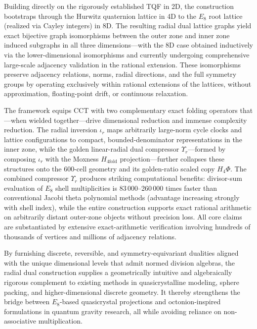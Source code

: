 \documentclass{article}
\begin{document}
Building directly on the rigorously established TQF in 2D, the construction bootstraps through the Hurwitz quaternion lattice in 4D to the $E_8$ root lattice (realized via Cayley integers) in 8D. The resulting radial dual lattice graphs yield exact bijective graph isomorphisms between the outer zone and inner zone induced subgraphs in all three dimensions---with the 8D case obtained inductively via the lower-dimensional isomorphisms and currently undergoing comprehensive large-scale adjacency validation in the rational extension. These isomorphisms preserve adjacency relations, norms, radial directions, and the full symmetry groups by operating exclusively within rational extensions of the lattices, without approximation, floating-point drift, or continuous relaxation.

The framework equips CCT with two complementary exact folding operators that---when wielded together---drive dimensional reduction and immense complexity reduction.
The radial inversion \(\iota_r\) maps arbitrarily large-norm cycle clocks and lattice configurations to compact, bounded-denominator representations in the inner zone,
while the golden linear-radial dual compressor \(\Upsilon_r\)---formed by composing \(\iota_r\) with the Moxness \(H_{4\mathrm{fold}}\) projection---further collapses these structures onto the 600-cell geometry and its golden-ratio scaled copy \(H_4\Phi\). The combined compressor \(\Upsilon_r\) produces striking computational benefits: divisor-sum evaluation of \(E_8\) shell multiplicities is 83\,000--260\,000 times faster than conventional Jacobi theta polynomial methods (advantage increasing strongly with shell index), while the entire construction supports exact rational arithmetic on arbitrarily distant outer-zone objects without precision loss.
All core claims are substantiated by extensive exact-arithmetic verification involving hundreds of thousands of vertices and millions of adjacency relations.

By furnishing discrete, reversible, and symmetry-equivariant dualities aligned with the unique dimensional levels that admit normed division algebras, the radial dual construction supplies a geometrically intuitive and algebraically rigorous complement to existing methods in quasicrystalline modeling, sphere packing, and higher-dimensional discrete geometry. It thereby strengthens the bridge between $E_8$-based quasicrystal projections and octonion-inspired formulations in quantum gravity research, all while avoiding reliance on non-associative multiplication.
\end{document}
